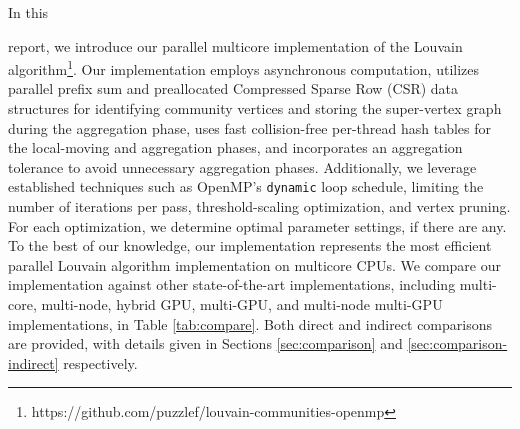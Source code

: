 
In this report, we introduce our parallel multicore implementation of the Louvain algorithm\footnote{https://github.com/puzzlef/louvain-communities-openmp}. Our implementation employs asynchronous computation, utilizes parallel prefix sum and preallocated Compressed Sparse Row (CSR) data structures for identifying community vertices and storing the super-vertex graph during the aggregation phase, uses fast collision-free per-thread hash tables for the local-moving and aggregation phases, and incorporates an aggregation tolerance to avoid unnecessary aggregation phases. Additionally, we leverage established techniques such as OpenMP's \verb|dynamic| loop schedule, limiting the number of iterations per pass, threshold-scaling optimization, and vertex pruning. For each optimization, we determine optimal parameter settings, if there are any. To the best of our knowledge, our implementation represents the most efficient parallel Louvain algorithm implementation on multicore CPUs. We compare our implementation against other state-of-the-art implementations, including multi-core, multi-node, hybrid GPU, multi-GPU, and multi-node multi-GPU implementations, in Table \ref{tab:compare}. Both direct and indirect comparisons are provided, with details given in Sections \ref{sec:comparison} and \ref{sec:comparison-indirect} respectively.











